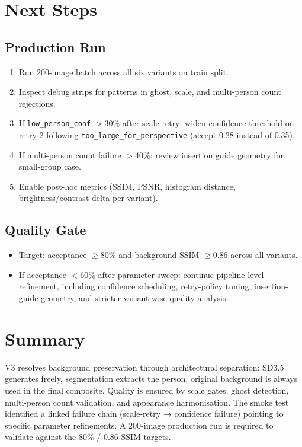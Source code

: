 \documentclass[12pt,a4paper]{article}
\begin{document}
\section{Next Steps}

\subsection{Production Run}
\begin{enumerate}
    \item Run 200-image batch across all six variants on train split.
    \item Inspect debug strips for patterns in ghost, scale, and multi-person count rejections.
    \item If \texttt{low\_person\_conf} $> 30\%$ after scale-retry: widen confidence threshold on retry 2 following \texttt{too\_large\_for\_perspective} (accept 0.28 instead of 0.35).
    \item If multi-person count failure $> 40\%$: review insertion guide geometry for small-group case.
    \item Enable post-hoc metrics (SSIM, PSNR, histogram distance, brightness/contrast delta per variant).
\end{enumerate}

\subsection{Quality Gate}
\begin{itemize}
    \item Target: acceptance $\geq 80\%$ and background SSIM $\geq 0.86$ across all variants.
    \item If acceptance $< 60\%$ after parameter sweep: continue pipeline-level refinement, including confidence scheduling, retry-policy tuning, insertion-guide geometry, and stricter variant-wise quality analysis.
\end{itemize}

\section{Summary}

V3 resolves background preservation through architectural separation: SD3.5 generates freely, segmentation extracts the person, original background is always used in the final composite. Quality is ensured by scale gates, ghost detection, multi-person count validation, and appearance harmonisation. The smoke test identified a linked failure chain (scale-retry → confidence failure) pointing to specific parameter refinements. A 200-image production run is required to validate against the 80\% / 0.86 SSIM targets.
\end{document}
